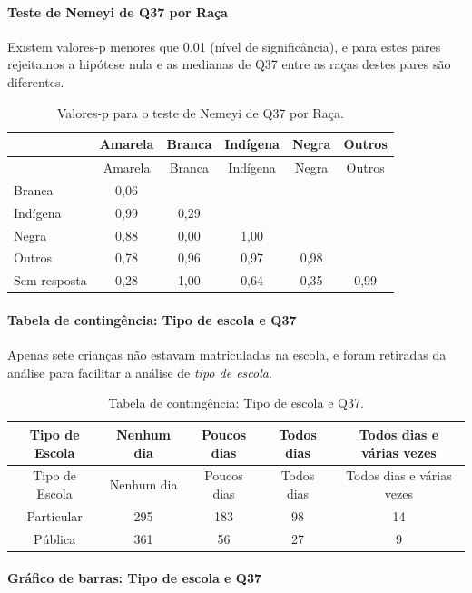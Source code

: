 \documentclass[]{article}
\let\oldparagraph\paragraph
\renewcommand{\paragraph}[1]{\oldparagraph{#1}\mbox{}}
\begin{document}
\hypertarget{teste-de-nemeyi-de-q37-por-rauxe7a}{%
\paragraph{Teste de Nemeyi de Q37 por Raça}\label{teste-de-nemeyi-de-q37-por-rauxe7a}}

Existem valores-p menores que 0.01 (nível de significância), e para estes pares rejeitamos a hipótese nula e as medianas de Q37 entre as raças destes pares são diferentes.

\begin{longtable}[]{@{}lccccc@{}}
\caption{\label{tab:unnamed-chunk-1408}Valores-p para o teste de Nemeyi de Q37 por Raça.}\tabularnewline
\toprule
& Amarela & Branca & Indígena & Negra & Outros\tabularnewline
\midrule
\endfirsthead
\toprule
& Amarela & Branca & Indígena & Negra & Outros\tabularnewline
\midrule
\endhead
Branca & 0,06 & & & &\tabularnewline
Indígena & 0,99 & 0,29 & & &\tabularnewline
Negra & 0,88 & 0,00 & 1,00 & &\tabularnewline
Outros & 0,78 & 0,96 & 0,97 & 0,98 &\tabularnewline
Sem resposta & 0,28 & 1,00 & 0,64 & 0,35 & 0,99\tabularnewline
\bottomrule
\end{longtable}

\cleardoublepage

\hypertarget{tabela-de-continguxeancia-tipo-de-escola-e-q37}{%
\paragraph{Tabela de contingência: Tipo de escola e Q37}\label{tabela-de-continguxeancia-tipo-de-escola-e-q37}}

Apenas sete crianças não estavam matriculadas na escola, e foram retiradas da análise para facilitar a análise de \emph{tipo de escola}.

\begin{longtable}[]{@{}ccccc@{}}
\caption{\label{tab:unnamed-chunk-1409}Tabela de contingência: Tipo de escola e Q37.}\tabularnewline
\toprule
Tipo de Escola & Nenhum dia & Poucos dias & Todos dias & Todos dias e várias vezes\tabularnewline
\midrule
\endfirsthead
\toprule
Tipo de Escola & Nenhum dia & Poucos dias & Todos dias & Todos dias e várias vezes\tabularnewline
\midrule
\endhead
Particular & 295 & 183 & 98 & 14\tabularnewline
Pública & 361 & 56 & 27 & 9\tabularnewline
\bottomrule
\end{longtable}

\hypertarget{gruxe1fico-de-barras-tipo-de-escola-e-q37}{%
\paragraph{Gráfico de barras: Tipo de escola e Q37}\label{gruxe1fico-de-barras-tipo-de-escola-e-q37}}
\end{document}
